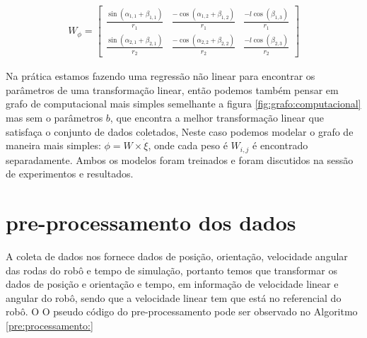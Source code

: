 \begin{align}
    W_{\phi} = 
    \begin{bmatrix}
        \frac{\sin(\alpha_{1,1} + \beta_{1,1})}{r_1} &  \frac{-\cos(\alpha_{1,2} + \beta_{1,2})}{r_1} & \frac{-l\cos(\beta_{1,3})}{r_1} \\
        \frac{\sin(\alpha_{2,1} + \beta_{2,1})}{r_2} &  \frac{-\cos(\alpha_{2,2} + \beta_{2,2})}{r_2} & \frac{-l\cos(\beta_{2,3})}{r_2}
    \end{bmatrix}
\end{align}

Na prática estamos fazendo uma regressão não linear para encontrar
os parâmetros de uma transformação linear, então podemos também pensar em
grafo de computacional mais simples semelhante a
figura \ref{fig:grafo:computacional} mas sem o parâmetros $b$, 
que encontra a melhor transformação
linear que satisfaça o conjunto de dados coletados,
Neste caso podemos modelar o grafo de maneira mais simples: $\phi=W \times \dot{\xi}$,
onde cada peso é $W_{i,j}$ é encontrado separadamente. Ambos os modelos foram
treinados e foram discutidos na sessão de experimentos e resultados.


\section{pre-processamento dos dados}
A coleta de dados nos fornece dados de posição, orientação, velocidade angular
das rodas do robô e tempo de simulação, portanto temos que transformar os dados
de posição e orientação e tempo, em informação de velocidade linear e angular
do robô, sendo que a velocidade linear tem que está no referencial do robô. O
O pseudo código do pre-processamento pode ser observado no Algoritmo \ref{pre:processamento:}


